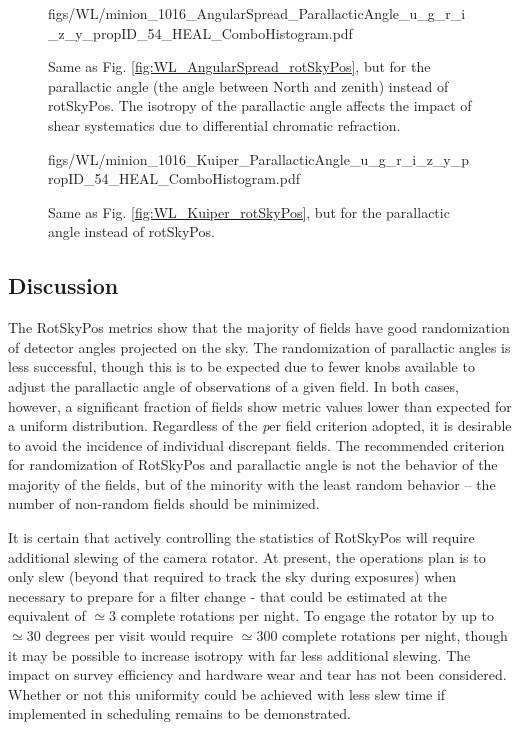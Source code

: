 
\begin{figure}[tbh!]
        {figs/WL/minion_1016_AngularSpread_ParallacticAngle_u_g_r_i_z_y_propID_54_HEAL_ComboHistogram.pdf}
\caption{Same as Fig. \ref{fig:WL_AngularSpread_rotSkyPos}, but for the parallactic angle (the angle
    between North and zenith) instead of rotSkyPos.  The isotropy of the parallactic angle affects
    the impact of shear systematics due to differential chromatic refraction.}
\label{fig:WL_AngularSpread_ParallacticAngle}
\end{figure}

\begin{figure}[tbh!]
        {figs/WL/minion_1016_Kuiper_ParallacticAngle_u_g_r_i_z_y_propID_54_HEAL_ComboHistogram.pdf}
\caption{Same as Fig. \ref{fig:WL_Kuiper_rotSkyPos}, but for the parallactic angle instead of
    rotSkyPos.}
\label{fig:WL_Kuiper_ParallacticAngle}
\end{figure}


\subsection{Discussion}

The RotSkyPos metrics show that the majority of fields have good randomization of detector angles
projected on the sky.  The randomization of parallactic angles is less successful, though this is to
be expected due to fewer knobs available to adjust the parallactic angle of observations of a given
field.  In both cases, however, a significant fraction of fields show metric values lower than
expected for a uniform distribution.  Regardless of the {\emph per field} criterion adopted, it is
desirable to avoid the incidence of individual discrepant fields.  The recommended criterion for
randomization of RotSkyPos and parallactic angle is not the behavior of the majority of the fields,
but of the minority with the least random behavior -- the number of non-random fields should be
minimized.

It is certain that actively controlling the statistics of RotSkyPos will require additional slewing
of the camera rotator.  At present, the operations plan is to only slew (beyond that required to
track the sky during exposures) when necessary to prepare for a filter change - that could be
estimated at the equivalent of $\simeq 3$ complete rotations per night.  To engage the rotator by up
to $\simeq 30$ degrees per visit would require $\simeq 300$ complete rotations per night, though it
may be possible to increase isotropy with far less additional slewing.  The impact on survey
efficiency and hardware wear and tear has not been considered.  Whether or not this uniformity could
be achieved with less slew time if implemented in scheduling remains to be demonstrated.

